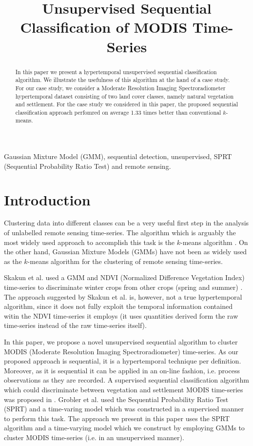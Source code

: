 \documentclass{article}
\title{Unsupervised Sequential Classification of MODIS Time-Series}
\begin{document}
%
\maketitle
%
\begin{abstract}
In this paper we present a hypertemporal unsupervised sequential classification algorithm.  
We illustrate the usefulness of this algorithm at the hand of a case study. For our case study, we consider a Moderate Resolution Imaging Spectroradiometer hypertemporal dataset consisting of two land cover classes, namely natural vegetation and settlement. For the 
case study we considered in this paper, the proposed sequential classification approach perfomred on average 1.33 times better than conventional $k$-means.
\end{abstract}
%
\begin{keywords}
Gaussian Mixture Model (GMM), sequential detection, unsupervised, SPRT (Sequential Probability Ratio Test) and remote sensing.
\end{keywords}
%

\section{Introduction}
\label{sec:intro}
Clustering data into different classes can be a very useful first step in the analysis of unlabelled remote sensing time-series. The algorithm
which is arguably the most widely used approach to accomplish this task is the $k$-means algorithm \cite{chen2013,viovy2000}. On the other hand, Gaussian Mixture Models (GMMs) have not been 
as widely used as the $k$-means algorithm for the clustering of remote sensing time-series.

Skakun et al. used a GMM and NDVI (Normalized Difference Vegetation Index) time-series to discriminate winter crops from other crops (spring and summer) \cite{skakun2017}.
The approach suggested by Skakun et al. is, however, not a true hypertemporal algorithm, since it does not fully exploit the temporal information contained witin the NDVI time-series it employs (it uses quantities derived 
form the raw time-series instead of the raw time-series itself).

In this paper, we propose a novel unsupervised sequential algorithm to cluster MODIS (Moderate Resolution Imaging Spectroradiometer) time-series. As our proposed approach is sequential, it is a hypertemporal technique per definition.
Moreover, as it is sequential it can be applied in an on-line fashion, i.e. process observations as they are recorded. A supervised sequential classification algorithm which could discriminate 
between vegetation and settlement MODIS time-series was proposed in \cite{ackermann2011t,grobler2012c}. Grobler et al. used the Sequential Probability Ratio Test (SPRT) and a time-varing model which was constructed in a supervised manner to perform this task. 
The approach we present in this paper uses the SPRT algorithm and a time-varying model which we construct by employing GMMs to cluster MODIS time-series (i.e. in an unsupervised manner).
\end{document}
